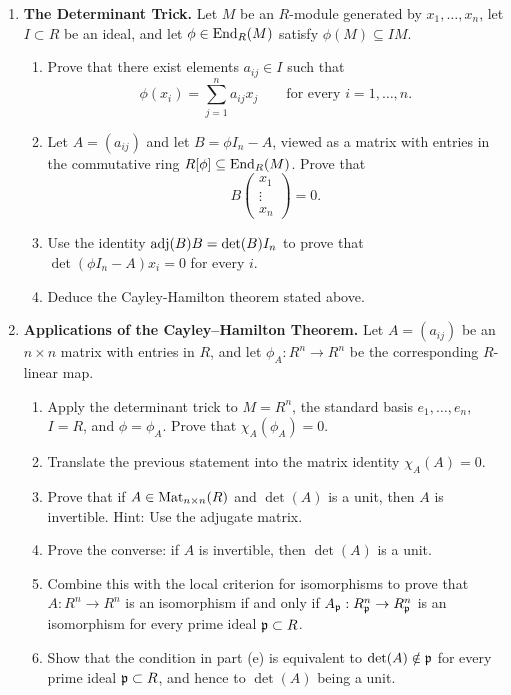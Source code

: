 \documentclass[12pt,reqno]{amsart}
\begin{document}
\begin{enumerate}[leftmargin=*, resume=problems]
\item \textbf{The Determinant Trick.} Let $M$ be an $R$-module generated by $x_1,\ldots,x_n$, let $I\subset R$ be an ideal, and let $\phi\in \operatorname{End}_R(M)$ satisfy $\phi(M)\subseteq IM$.
\begin{enumerate}
    \item Prove that there exist elements $a_{ij}\in I$ such that
    \[
    \phi(x_i)=\sum_{j=1}^n a_{ij}x_j
    \qquad\text{for every }i=1,\ldots,n.
    \]
    \item Let $A=(a_{ij})$ and let $B=\phi I_n-A$, viewed as a matrix with entries in the commutative ring $R[\phi]\subseteq \operatorname{End}_R(M)$. Prove that
    \[
    B
    \begin{pmatrix}
    x_1\\ \vdots \\ x_n
    \end{pmatrix}=0.
    \]
    \item Use the identity $\operatorname{adj}(B)B=\det(B)I_n$ to prove that $\det(\phi I_n-A)x_i=0$ for every $i$.
    \item Deduce the Cayley-Hamilton theorem stated above. 
    \end{enumerate}

\item \textbf{Applications of the Cayley--Hamilton Theorem.} Let $A=(a_{ij})$ be an $n\times n$ matrix with entries in $R$, and let $\phi_A:R^n\to R^n$ be the corresponding $R$-linear map.
\begin{enumerate}
    \item Apply the determinant trick to $M=R^n$, the standard basis $e_1,\ldots,e_n$, $I=R$, and $\phi=\phi_A$. Prove that $\chi_A(\phi_A)=0$.
    \item Translate the previous statement into the matrix identity $\chi_A(A)=0$.
    \item Prove that if $A\in \operatorname{Mat}_{n\times n}(R)$ and $\det(A)$ is a unit, then $A$ is invertible. Hint: Use the adjugate matrix.
    \item Prove the converse: if $A$ is invertible, then $\det(A)$ is a unit.
    \item Combine this with the local criterion for isomorphisms to prove that $A:R^n\to R^n$ is an isomorphism if and only if $A_{\mathfrak{p}}:R_{\mathfrak{p}}^n\to R_{\mathfrak{p}}^n$ is an isomorphism for every prime ideal $\mathfrak{p}\subset R$.
    \item Show that the condition in part (e) is equivalent to $\det(A)\notin \mathfrak{p}$ for every prime ideal $\mathfrak{p}\subset R$, and hence to $\det(A)$ being a unit.
\end{enumerate}


\end{enumerate}
\end{document}
